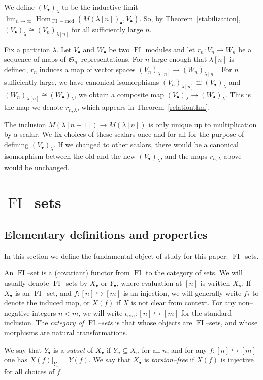 \documentclass[ALCO,ThmDefs,Unicode,epreuves]{cedram}
\DeclareMathOperator{\FI}{FI}
\DeclareMathOperator{\Hom}{Hom}
\newcommand{\Sn}{\mathfrak{S}}
\newcommand{\dt}{\bullet}
\begin{document}
We define $(V_{\dt})_{\lambda}$ to be the inductive limit $\lim_{n \to \infty} \Hom_{\FI-\text{mod}}(M(\lambda[n])_\dt, V_\dt)$.
So, by Theorem~\ref{stabilization}, $(V_{\dt})_{\lambda} \cong (V_n)_{\lambda[n]}$ for all sufficiently large $n$. 

Fix a partition $\lambda$.
Let $V_{\dt}$ and $W_{\dt}$ be two $\FI$ modules and let $r_n: V_n \to W_n$ be a sequence of maps of $\Sn_n$--representations.
For $n$ large enough that $\lambda[n]$ is defined, $r_n$ induces a map of vector spaces $(V_{n})_{\lambda[n]} \to (W_{n})_{\lambda[n]}$.
For $n$ sufficiently large, we have canonical isomorphisms $(V_{n})_{\lambda[n]} \cong (V_{\dt})_{\lambda}$ and $(W_{n})_{\lambda[n]} \cong (W_{\dt})_{\lambda}$, we obtain a composite map $(V_{\dt})_{\lambda} \to (W_{\dt})_{\lambda}$. This is the map we denote $r_{n, \lambda}$, which appears in Theorem~\ref{relationthm}.

The inclusion $M(\lambda[n+1]) \to M(\lambda[n])$ is only unique up to multiplication by a scalar. We fix choices of these scalars once and for all for the purpose of defining $(V_{\dt})_{\lambda}$. If we changed to other scalars, there would be a canonical isomorphism between the old and the new $(V_{\dt})_{\lambda}$, and the maps $r_{n, \lambda}$ above would be unchanged.

\section{\texorpdfstring{$\FI$}{FI}--sets}

\subsection{Elementary definitions and properties}

In this section we define the fundamental object of study for this paper: $\FI$--sets.

\begin{definition}
An $\FI$--set is a (covariant) functor from $\FI$ to the category of sets. We will usually denote $\FI$--sets by $X_\dt$ or $Y_\dt$, where evaluation at $[n]$ is written $X_n$. If $X_\dt$ is an $\FI$--set, and $f:[n] \hookrightarrow [m]$ is an injection, we will generally write $f_{\ast}$ to denote the induced map, or $X(f)$ if $X$ is not clear from context. For any non--negative integers $n < m$, we will write $\iota_{nm}:[n] \hookrightarrow [m]$ for the standard inclusion. The \emph{category of $\FI$--sets} is that whose objects are $\FI$--sets, and whose morphisms are natural transformations.

We say that $Y_\dt$ is a \emph{subset} of $X_\dt$ if $Y_n \subseteq X_n$ for all $n$, and for any $f:[n] \hookrightarrow [m]$ one has $X(f)|_{Y_n} = Y(f)$. We say that $X_\dt$ is \emph{torsion--free} if $X(f)$ is injective for all choices of $f$.
\end{definition}
\end{document}
